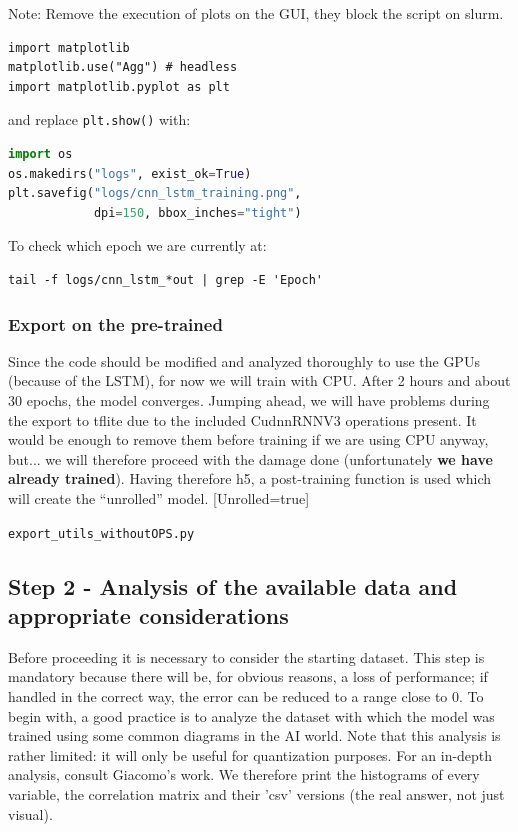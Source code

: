 \begin{center}
    Note: Remove the execution of plots on the GUI, they block the script on slurm. 
\end{center}

\begin{verbatim}
import matplotlib
matplotlib.use("Agg") # headless
import matplotlib.pyplot as plt
\end{verbatim}
and replace \texttt{plt.show()} with:

\begin{lstlisting}[language=Python]
import os
os.makedirs("logs", exist_ok=True)
plt.savefig("logs/cnn_lstm_training.png",
            dpi=150, bbox_inches="tight")
\end{lstlisting}
To check which epoch we are currently at: 
\begin{verbatim}
tail -f logs/cnn_lstm_*out | grep -E 'Epoch'
\end{verbatim}

\subsubsection{Export on the pre-trained}
Since the code should be modified and analyzed thoroughly to use the GPUs (because of the LSTM), for now we will train with CPU. After 2 hours and about 30 epochs, the model converges.
Jumping ahead, we will have problems during the export to tflite due to the included CudnnRNNV3 operations present. It would be enough to remove them before training if we are using CPU anyway, but... we will therefore proceed with the damage done (unfortunately \textbf{we have already trained}). Having therefore h5, a post-training function is used which will create the ``unrolled'' model. [Unrolled=true]

\begin{center}
    \texttt{export\_utils\_withoutOPS.py} 
\end{center}

\subsection{Step 2 - Analysis of the available data and appropriate considerations}

Before proceeding it is necessary to consider the starting dataset. This step is mandatory because there will be, for obvious reasons, a loss of performance; if handled in the correct way, the error can be reduced to a range close to 0.
To begin with, a good practice is to analyze the dataset with which the model was trained using some common diagrams in the AI world. Note that this analysis is rather limited: it will only be useful for quantization purposes. For an in-depth analysis, consult Giacomo's work.
We therefore print the histograms of every variable, the correlation matrix and their 'csv' versions (the real answer, not just visual).

